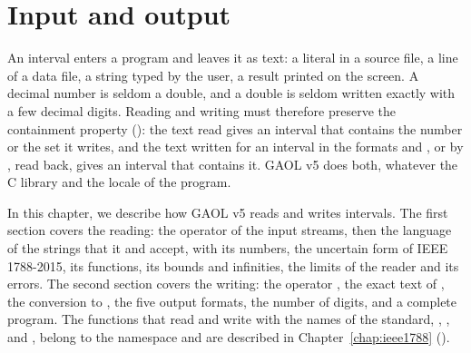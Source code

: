 \chapter{Input and output}\label{chap:io}

An interval enters a program and leaves it as text: a literal in a source
file, a line of a data file, a string typed by the user, a result printed on
the screen. A decimal number is seldom a double, and a double is seldom
written exactly with a few decimal digits. Reading and writing must therefore
preserve the containment property (): the text read
gives an interval that contains the number or the set it writes, and the text
written for an interval in the formats  and , or
by , read back, gives an interval that contains it. GAOL
v5 does both, whatever the C library and the locale of the
program.\newinvfive

\medskip
In this chapter, we describe how GAOL v5 reads and writes intervals. The
first section covers the reading: the operator \code{>{}>} of the input
streams, then the language of the strings that it and 
accept, with its numbers, the uncertain form of IEEE 1788-2015, its functions,
its bounds and infinities, the limits of the reader and its errors. The second
section covers the writing: the operator \code{<{}<}, the exact text of
, the conversion to , the five output
formats, the number of digits, and a complete program. The functions that
read and write with the names of the standard, ,
,  and , belong to the namespace
 and are described in Chapter~\ref{chap:ieee1788}
().

